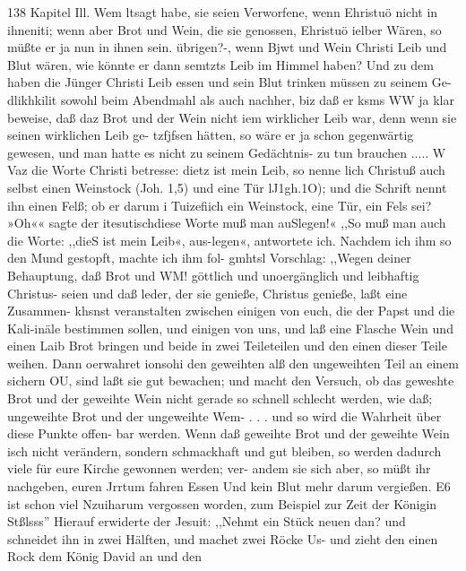 138 Kapitel Ill.
Wem ltsagt habe, sie seien Verworfene, wenn Ehristuö nicht in
ihneniti; wenn aber Brot und Wein, die sie genossen, Ehristuö
ielber Wären, so müßte er ja nun in ihnen sein. übrigen?-, wenn
Bjwt und Wein Christi Leib und Blut wären, wie könnte er dann
semtzts Leib im Himmel haben? Und zu dem haben die Jünger
Christi Leib essen und sein Blut trinken müssen zu seinem Ge-
dlikhkilit sowohl beim Abendmahl als auch nachher, biz daß er
ksms WW ja klar beweise, daß daz Brot und der Wein nicht
iem wirklicher Leib war, denn wenn sie seinen wirklichen Leib ge-
tzfjfsen hätten, so wäre er ja schon gegenwärtig gewesen, und man
hatte es nicht zu seinem Gedächtnis- zu tun brauchen .....
W Vaz die Worte Christi betresse: dietz ist mein Leib, so nenne
lich Christuß auch selbst einen Weinstock (Joh. 1,5) und eine Tür
lJ1gh.1O); und die Schrift nennt ihn einen Felß; ob er darum
i Tuizefiich ein Weinstock, eine Tür, ein Fels sei? »Oh«« sagte der
itesutischdiese Worte muß man auSlegen!« ,,So muß man auch
die Worte: ,,dieS ist mein Leib«, aus-legen«, antwortete ich.
Nachdem ich ihm so den Mund gestopft, machte ich ihm fol-
gmhtsl Vorschlag: ,,Wegen deiner Behauptung, daß Brot und
WM! göttlich und unoergänglich und leibhaftig Christus- seien und
daß leder, der sie genieße, Christus genieße, laßt eine Zusammen-
khsnst veranstalten zwischen einigen von euch, die der Papst und
die Kali-inäle bestimmen sollen, und einigen von uns, und laß eine
Flasche Wein und einen Laib Brot bringen und beide in zwei
Teileteilen und den einen dieser Teile weihen. Dann oerwahret
ionsohi den geweihten alß den ungeweihten Teil an einem sichern
OU, sind laßt sie gut bewachen; und macht den Versuch, ob das
geweshte Brot und der geweihte Wein nicht gerade so schnell
schlecht werden, wie daß; ungeweihte Brot und der ungeweihte
Wem- . . . und so wird die Wahrheit über diese Punkte offen-
bar werden. Wenn daß geweihte Brot und der geweihte Wein
isch nicht verändern, sondern schmackhaft und gut bleiben, so
werden dadurch viele für eure Kirche gewonnen werden; ver-
andem sie sich aber, so müßt ihr nachgeben, euren Jrrtum fahren
Essen Und kein Blut mehr darum vergießen. E6 ist schon viel
Nzuiharum vergossen worden, zum Beispiel zur Zeit der Königin
Stßlsss'' Hierauf erwiderte der Jesuit: ,,Nehmt ein Stück neuen
dan? und schneidet ihn in zwei Hälften, und machet zwei Röcke
Us- und zieht den einen Rock dem König David an und den


